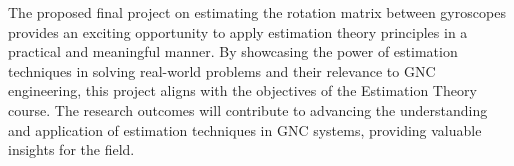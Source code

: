 \documentclass{article}
\begin{document}
The proposed final project on estimating the rotation matrix between gyroscopes provides an exciting opportunity to apply estimation theory principles in a practical and meaningful manner. By showcasing the power of estimation techniques in solving real-world problems and their relevance to GNC engineering, this project aligns with the objectives of the Estimation Theory course. The research outcomes will contribute to advancing the understanding and application of estimation techniques in GNC systems, providing valuable insights for the field.
\end{document}
